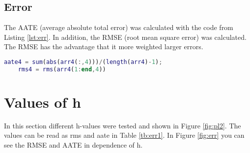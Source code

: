 		\subsection{Error}
		The AATE (average absolute total error) was calculated with the code from Listing \ref{lst:err}. In addition, the RMSE (root mean square error)  was calculated. The RMSE has the advantage that it more weighted larger errors.
\begin{lstlisting}[caption={The funcion}, language=matlab, backgroundcolor = \color{lgray}, firstnumber=23, label={lst:err}]
	aate4 = sum(abs(arr4(:,4)))/(length(arr4)-1);
	rms4 = rms(arr4(1:end,4))	
\end{lstlisting}


	\newpage		
	\section{Values of h}\label{sec:val}
	In this section different h-values were tested and shown in Figure \ref{fig:pl2}. The values can be read as rms and aate in Table \ref{tb:err1}. In Figure \ref{fig:err} you can see the RMSE and AATE in dependence of h. 
		
